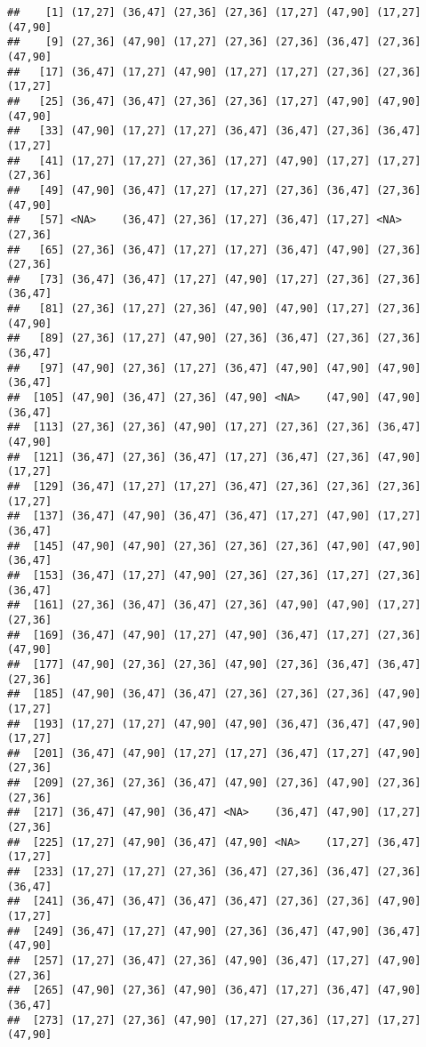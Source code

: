 \documentclass[12pt,]{article}
\begin{document}
\begin{verbatim}
##    [1] (17,27] (36,47] (27,36] (27,36] (17,27] (47,90] (17,27] (47,90]
##    [9] (27,36] (47,90] (17,27] (27,36] (27,36] (36,47] (27,36] (47,90]
##   [17] (36,47] (17,27] (47,90] (17,27] (17,27] (27,36] (27,36] (17,27]
##   [25] (36,47] (36,47] (27,36] (27,36] (17,27] (47,90] (47,90] (47,90]
##   [33] (47,90] (17,27] (17,27] (36,47] (36,47] (27,36] (36,47] (17,27]
##   [41] (17,27] (17,27] (27,36] (17,27] (47,90] (17,27] (17,27] (27,36]
##   [49] (47,90] (36,47] (17,27] (17,27] (27,36] (36,47] (27,36] (47,90]
##   [57] <NA>    (36,47] (27,36] (17,27] (36,47] (17,27] <NA>    (27,36]
##   [65] (27,36] (36,47] (17,27] (17,27] (36,47] (47,90] (27,36] (27,36]
##   [73] (36,47] (36,47] (17,27] (47,90] (17,27] (27,36] (27,36] (36,47]
##   [81] (27,36] (17,27] (27,36] (47,90] (47,90] (17,27] (27,36] (47,90]
##   [89] (27,36] (17,27] (47,90] (27,36] (36,47] (27,36] (27,36] (36,47]
##   [97] (47,90] (27,36] (17,27] (36,47] (47,90] (47,90] (47,90] (36,47]
##  [105] (47,90] (36,47] (27,36] (47,90] <NA>    (47,90] (47,90] (36,47]
##  [113] (27,36] (27,36] (47,90] (17,27] (27,36] (27,36] (36,47] (47,90]
##  [121] (36,47] (27,36] (36,47] (17,27] (36,47] (27,36] (47,90] (17,27]
##  [129] (36,47] (17,27] (17,27] (36,47] (27,36] (27,36] (27,36] (17,27]
##  [137] (36,47] (47,90] (36,47] (36,47] (17,27] (47,90] (17,27] (36,47]
##  [145] (47,90] (47,90] (27,36] (27,36] (27,36] (47,90] (47,90] (36,47]
##  [153] (36,47] (17,27] (47,90] (27,36] (27,36] (17,27] (27,36] (36,47]
##  [161] (27,36] (36,47] (36,47] (27,36] (47,90] (47,90] (17,27] (27,36]
##  [169] (36,47] (47,90] (17,27] (47,90] (36,47] (17,27] (27,36] (47,90]
##  [177] (47,90] (27,36] (27,36] (47,90] (27,36] (36,47] (36,47] (27,36]
##  [185] (47,90] (36,47] (36,47] (27,36] (27,36] (27,36] (47,90] (17,27]
##  [193] (17,27] (17,27] (47,90] (47,90] (36,47] (36,47] (47,90] (17,27]
##  [201] (36,47] (47,90] (17,27] (17,27] (36,47] (17,27] (47,90] (27,36]
##  [209] (27,36] (27,36] (36,47] (47,90] (27,36] (47,90] (27,36] (27,36]
##  [217] (36,47] (47,90] (36,47] <NA>    (36,47] (47,90] (17,27] (27,36]
##  [225] (17,27] (47,90] (36,47] (47,90] <NA>    (17,27] (36,47] (17,27]
##  [233] (17,27] (17,27] (27,36] (36,47] (27,36] (36,47] (27,36] (36,47]
##  [241] (36,47] (36,47] (36,47] (36,47] (27,36] (27,36] (47,90] (17,27]
##  [249] (36,47] (17,27] (47,90] (27,36] (36,47] (47,90] (36,47] (47,90]
##  [257] (17,27] (36,47] (27,36] (47,90] (36,47] (17,27] (47,90] (27,36]
##  [265] (47,90] (27,36] (47,90] (36,47] (17,27] (36,47] (47,90] (36,47]
##  [273] (17,27] (27,36] (47,90] (17,27] (27,36] (17,27] (17,27] (47,90]

\end{verbatim}
\end{document}
